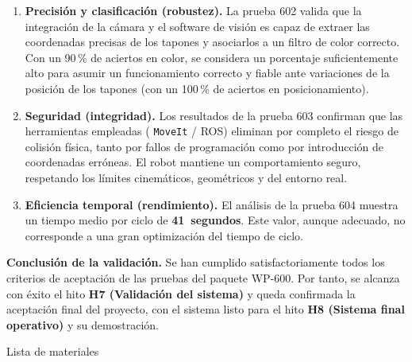 \documentclass[12pt,a4paper]{article}
\makeatletter
\newcommand{\secfmt}[1]{%
  \noindent\colorbox{BlueHeader}{%
    \parbox[b]{\dimexpr\linewidth-2\fboxsep}{%
      \vspace{5pt}%
      \textcolor{white}{\large\bfseries #1}%
      \vspace{5pt}%
    }%
  }\par\vspace{4pt}%
}
\renewcommand\section{%
  \@ifstar\section@star\section@nostar
}
\newcommand\section@nostar[1]{%
  \refstepcounter{section}%
  \addcontentsline{toc}{section}{\protect\numberline{\thesection}#1}%
  \secfmt{\thesection.\enspace #1}%
}
\newcommand\section@star[1]{%
  \secfmt{#1}%
}
\newcommand{\code}[1]{%
  \begingroup
  \def\_{\char`_\penalty0 }%
  \def\/{\char`/\penalty0 }%
  \texttt{\small #1}%
  \endgroup}
\makeatother
\begin{document}
\begin{enumerate}
  \item \textbf{Precisión y clasificación (robustez).} La prueba 602 valida que la integración de la
        cámara y el software de visión es capaz de extraer las coordenadas precisas de los tapones y
        asociarlos a un filtro de color correcto. Con un 90\,\% de aciertos en color, se considera un
        porcentaje suficientemente alto para asumir un funcionamiento correcto y fiable ante variaciones
        de la posición de los tapones (con un 100\,\% de aciertos en posicionamiento).
  \item \textbf{Seguridad (integridad).} Los resultados de la prueba 603 confirman que las herramientas
        empleadas (\code{MoveIt} / ROS) eliminan por completo el riesgo de colisión física, tanto por
        fallos de programación como por introducción de coordenadas erróneas. El robot mantiene un
        comportamiento seguro, respetando los límites cinemáticos, geométricos y del entorno real.
  \clearpage
  \item \textbf{Eficiencia temporal (rendimiento).} El análisis de la prueba 604 muestra un tiempo medio
        por ciclo de \textbf{41~segundos}. Este valor, aunque adecuado, no corresponde a una gran
        optimización del tiempo de ciclo.
\end{enumerate}

\noindent\textbf{Conclusión de la validación.}
Se han cumplido satisfactoriamente todos los criterios de aceptación de las pruebas del paquete WP-600.
Por tanto, se alcanza con éxito el hito \textbf{H7 (Validación del sistema)} y queda confirmada la
aceptación final del proyecto, con el sistema listo para el hito \textbf{H8 (Sistema final operativo)} y
su demostración.

\clearpage
\section{Lista de materiales}
\end{document}
